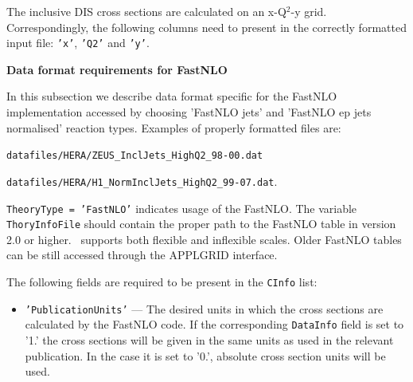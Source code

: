 \begin{description}
The inclusive DIS cross sections are calculated on an x-Q$^2$-y grid. Correspondingly,
the following columns need to present in the correctly formatted input file: 
{\tt 'x'}, {\tt 'Q2'} and {\tt 'y'}.



\item \bf{Data format requirements for FastNLO} \rm

In this subsection we describe data format specific for the FastNLO implementation
accessed by choosing 'FastNLO jets' and 'FastNLO ep jets normalised' reaction types.
Examples of properly formatted files are:

   {\tt datafiles/HERA/ZEUS\_InclJets\_HighQ2\_98-00.dat}

   {\tt datafiles/HERA/H1\_NormInclJets\_HighQ2\_99-07.dat}.

{\tt TheoryType = 'FastNLO'} indicates usage of the FastNLO. The variable {\tt ThoryInfoFile} 
should contain the proper path to the FastNLO table in version 2.0 or higher.
\fitter\ supports both flexible and inflexible scales.
Older FastNLO tables can be still accessed through the APPLGRID interface.

The following fields are required to be present in the {\tt CInfo} list:

\begin{itemize}

    \item {\tt 'PublicationUnits'} --- The desired units in which the cross sections 
    are calculated by the FastNLO code. If the corresponding {\tt DataInfo} field is 
    set to '1.' the cross sections will be given in the same units as used in the
    relevant publication. In the case it is set to '0.', absolute cross section
    units will be used. 


\end{itemize}
\end{description}
